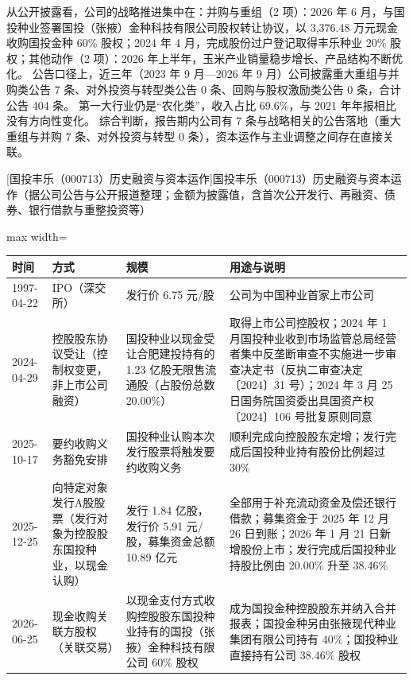  从公开披露看，公司的战略推进集中在：并购与重组（2 项）：2026 年 6 月，与国投种业签署国投（张掖）金种科技有限公司股权转让协议，以 3,376.48 万元现金收购国投金种 60\% 股权；2024 年 4 月，完成股份过户登记取得丰乐种业 20\% 股权；其他动作（2 项）：2026 年上半年，玉米产业销量稳步增长、产品结构不断优化。 公告口径上，近三年（2023 年 9 月---2026 年 9 月）公司披露重大重组与并购类公告 7 条、对外投资与转型类公告 0 条、回购与股权激励类公告 0 条，合计公告 404 条。 第一大行业仍是“农化类”，收入占比 69.6\%，与 2021 年年报相比没有方向性变化。 综合判断，报告期内公司有 7 条与战略相关的公告落地（重大重组与并购 7 条、对外投资与转型 0 条），资本运作与主业调整之间存在直接关联。

\begin{center}\small\setlength{\tabcolsep}{4pt}
[国投丰乐（000713）历史融资与资本运作]{国投丰乐（000713）历史融资与资本运作（据公司公告与公开报道整理；金额为披露值，含首次公开发行、再融资、债券、银行借款与重整投资等）}
\begin{adjustbox}{max width=\textwidth}
\begin{tabular}{@{}p{1.45cm}p{2.55cm}p{4.05cm}p{4.95cm}@{}}
\toprule
时间 & 方式 & 规模 & 用途与说明 \\
\midrule
1997-04-22 & IPO（深交所） & 发行价 6.75 元/\allowbreak{}股 & 公司为中国种业首家上市公司 \\
2024-04-29 & 控股股东协议受让（控制权变更，非上市公司融资） & 国投种业以现金受让合肥建投持有的 1.23 亿股无限售流通股（占股份总数 20.00\%） & 取得上市公司控股权；2024 年 1 月国投种业收到市场监管总局经营者集中反垄断审查不实施进一步审查决定书（反执二审查决定〔2024〕31 号）；2024 年 3 月 25 日国务院国资委出具国资产权〔2024〕106 号批复原则同意 \\
2025-10-17 & 要约收购义务豁免安排 & 国投种业认购本次发行股票将触发要约收购义务 & 顺利完成向控股股东定增；发行完成后国投种业持有股份比例超过 30\% \\
2025-12-25 & 向特定对象发行A股股票（发行对象为控股股东国投种业，以现金认购） & 发行 1.84 亿股，\allowbreak{}发行价 5.91 元/\allowbreak{}股，\allowbreak{}募集资金总额 10.89 亿元 & 全部用于补充流动资金及偿还银行借款；募集资金于 2025 年 12 月 26 日到账；2026 年 1 月 21 日新增股份上市；发行完成后国投种业持股比例由 20.00\% 升至 38.46\% \\
2026-06-25 & 现金收购关联方股权（关联交易） & 以现金支付方式收购控股股东国投种业持有的国投（张掖）金种科技有限公司 60\% 股权 & 成为国投金种控股股东并纳入合并报表；国投金种另由张掖现代种业集团有限公司持有 40\%；国投种业直接持有公司 38.46\% 股权 \\
\bottomrule
\end{tabular}
\end{adjustbox}
\end{center}

